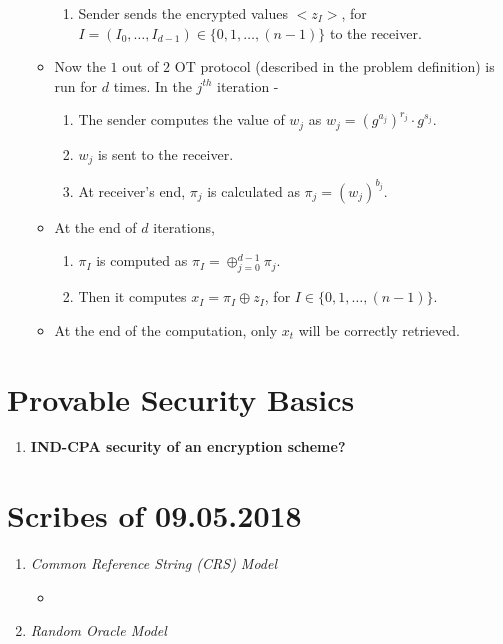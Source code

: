 \documentclass{article}
\begin{document}
\begin{enumerate}
\begin{itemize}
\begin{enumerate}
\item Sender sends the encrypted values $<z_I>$, for $I = (I_0,\ldots,I_{d-1}) \in \{0, 1, \ldots, (n-1)\}$ to the receiver.
\end{enumerate}

\item Now the $1$ out of $2$ OT protocol (described in the problem definition) is run for $d$ times. In the $j^{th}$ iteration -

\begin{enumerate}
\item The sender computes the value of $w_j$ as $w_j = {(g^{a_j})^{r_j}} \cdot {g^{s_j}}$.
\item $w_j$ is sent to the receiver.
\item At receiver's end, ${\pi}_j$ is calculated as ${\pi}_j = {(w_j)}^{b_j}$.
\end{enumerate}

\item At the end of $d$ iterations, 
\begin{enumerate}
\item ${\pi}_I$ is computed as ${\pi}_I = \oplus_{j=0}^{d-1} {{\pi}_j}$.
\item Then it computes $x_I = {\pi}_I \oplus z_I$, for $I \in \{0, 1, \ldots, (n-1)\}$.
 \end{enumerate}

\item At the end of the computation, only $x_t$ will be correctly retrieved.
\end{itemize}
\end{enumerate}

\section{Provable Security Basics}
\begin{enumerate}
\item \textbf{IND-CPA security of an encryption scheme?}
\end{enumerate}

\section{Scribes of 09.05.2018}
\begin{enumerate}
\item \textit{Common Reference String (CRS) Model}
\begin{itemize}
\item 
\end{itemize}
\item \textit{Random Oracle Model}
\end{enumerate}
\end{document}
